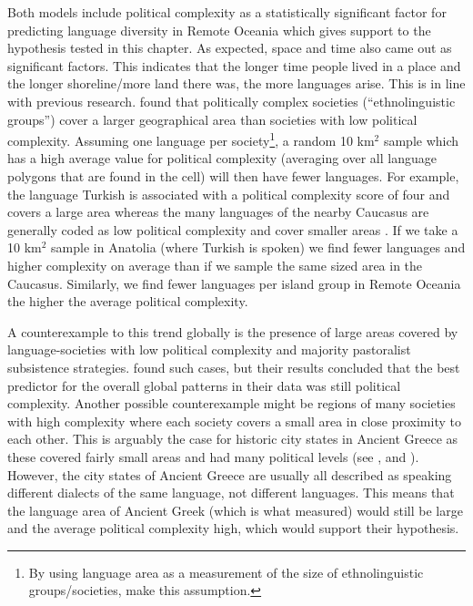 \documentclass[a4paper,10pt]{article} %
\begin{document}
Both models include political complexity as a statistically significant factor for predicting language diversity in Remote Oceania which gives support to the hypothesis tested in this chapter. As expected, space and time also came out as significant factors. This indicates that the longer time people lived in a place and the longer shoreline/more land there was, the more languages arise. This is in line with previous research. \citet{curriemace2009} found that politically complex societies (``ethnolinguistic groups'') cover a larger geographical area than societies with low political complexity.  Assuming one language per society\footnote{By using language area as a measurement of the size of ethnolinguistic groups/societies, \citet{curriemace2009} make this assumption.}, a random 10 km$^2$ sample which has a high average value for political complexity (averaging over all language polygons that are found in the cell) will then have fewer languages. For example, the language Turkish is associated with a political complexity score of four \citep{d_place_all} and covers a large area whereas the many languages of the nearby Caucasus are generally coded as low political complexity and cover smaller areas \citep{ethnologue2005}. If we take a 10 km$^2$ sample in Anatolia (where Turkish is spoken) we find fewer languages and higher complexity on average than if we sample the same sized area in the Caucasus. Similarly, we find fewer languages per island group in Remote Oceania the higher the average political complexity.

A counterexample to this trend globally is the presence of large areas covered by language-societies with low political complexity and majority pastoralist subsistence strategies. \citet{curriemace2009} found such cases, but their results concluded that the best predictor for the overall global patterns in their data was still political complexity. Another possible counterexample might be regions of many societies with high complexity where each society covers a small area in close proximity to each other. This is arguably the case for historic city states in Ancient Greece as these covered fairly small areas and had many political levels (see \citet{cartwright_2013}, and \citet[19]{sealey1976history}). However, the city states of Ancient Greece are usually all described as speaking different dialects of the same language, not different languages. This means that the language area of Ancient Greek (which is what \citet{curriemace2009} measured) would still be large and the average political complexity high, which would support their hypothesis.
\end{document}
